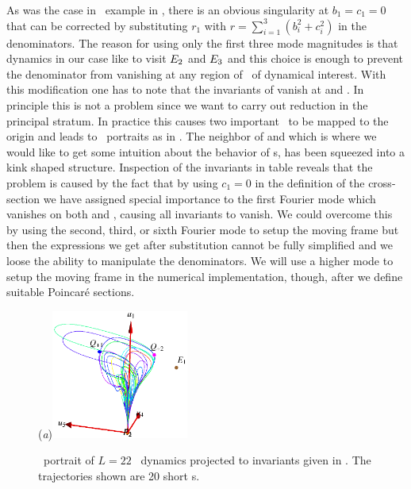 As was the case in \CLe\ example in ,
there is an obvious singularity at $b_1=c_1=0$ that can be corrected by substituting
$r_1$ with $r=\sum_{i=1}^3 (b_i^2+c_i^2)$ in the denominators.
The reason for using only the first three mode magnitudes is
that dynamics in our case like to visit $E_{2}$ and $E_{3}$
and this choice is enough to prevent the denominator from
vanishing at any region of \statesp\ of dynamical interest.
With this modification one has to note that the invariants of
 vanish at  and . In principle
this is not a problem since we want to carry out reduction in
the principal stratum. In practice this causes two important
\eqva\ to be mapped to the origin and leads to \statesp\
portraits as in . The neighbor of
 and  which is where we would like to get some
intuition about the behavior of \rpo s, has been squeezed into
a kink shaped structure. Inspection of the invariants in table
 reveals
that the problem is caused by the fact that by using $c_1=0$
in the definition of the cross-section we have
assigned special importance to the first Fourier mode
which vanishes
on both  and , causing all invariants to vanish.
We could overcome this by using the second, third, or sixth Fourier
mode to setup the moving frame but then the expressions we get after
substitution cannot be fully simplified and we loose the ability
to manipulate the denominators. We will use a higher mode to setup the moving
frame in the numerical implementation, though,
after we define suitable Poincar\'e sections.

\begin{figure}[t]
\begin{center}
  (\textit{a})\includegraphics[width=0.4\textwidth]{../figs/ksSO2inv145eqbTo0}
\end{center}
\caption[\KS\  reduced \statesp, modified invariants]
   {\Statesp\ portrait of $L=22$ \KS\ dynamics projected to
   invariants given in . The trajectories
   shown are 20 short \rpo s. }
\label{fig:ksSO2eqbTo0}
\end{figure}

